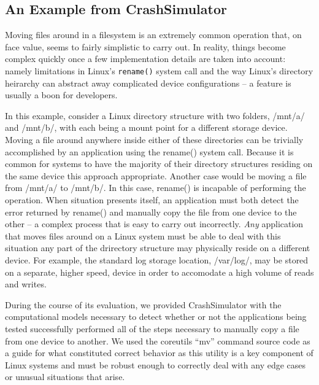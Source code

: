     \subsection{An Example from CrashSimulator}

    Moving files around in a filesystem is an extremely common operation that, on face value, seems to fairly simplistic
    to carry out.  In reality, things become complex quickly once a few implementation details are taken into account:
    namely limitations in Linux's {\tt rename()} system call and the way Linux's directory heirarchy can abstract away
    complicated device configurations -- a feature is usually a boon for developers.

    In this example, consider a Linux directory structure with two folders, /mnt/a/ and /mnt/b/, with each being a mount
    point for a different storage device.  Moving a file around anywhere inside either of these directories can be
    trivially accomplished by an application using the rename() system call.  Because it is common for systems to have
    the majority of their directory structures residing on the same device this approach appropriate.  Another case
    would be moving a file from /mnt/a/ to /mnt/b/.  In this case, rename() is incapable of performing the operation.
    When situation presents itself, an application must both detect the error returned by rename() and manually copy the
    file from one device to the other -- a complex process that is easy to carry out incorrectly.  \emph{Any}
    application that moves files around on a Linux system must be able to deal with this situation any part of the
    drirectory structure may physically reside on a different device.  For example, the standard log storage location,
    /var/log/, may be stored on a separate, higher speed, device in order to accomodate a high volume of reads and writes.

    During the course of its evaluation, we provided CrashSimulator with the computational models necessary to detect
    whether or not the applications being tested successfully performed all of the steps necessary to manually copy a
    file from one device to another.  We used the coreutils ``mv'' command source code as a guide for what constituted
    correct behavior as this utility is a key component of Linux systems and must be robust enough to correctly deal
    with any edge cases or unusual situations that arise.

